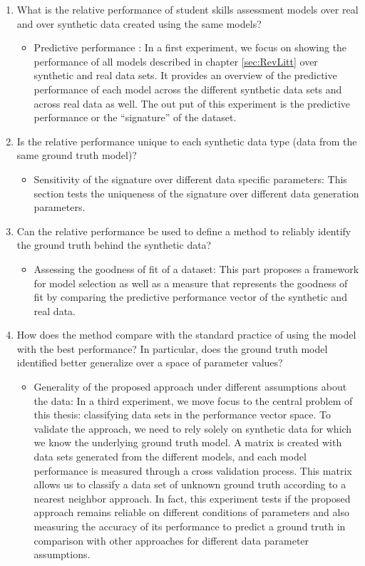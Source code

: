 \begin{enumerate}
\item What is the relative performance of student skills assessment models over real and over synthetic data created using the same models?
\begin{itemize}
\item Predictive performance : In a first experiment, we focus on showing the performance of all models described in chapter \ref{sec:RevLitt} over synthetic and real data sets.  It provides an overview of the predictive performance of each model across the different synthetic data sets and across real data as well. The out put of this experiment is the predictive performance or the ``signature'' of the dataset.
\end{itemize}
\item Is the relative performance unique to each synthetic data type (data from the same ground truth model)?
\begin{itemize}
\item Sensitivity of the signature over different data specific parameters: This section tests the uniqueness of the signature over different data generation parameters.
\end{itemize}
\item Can the relative performance be used to define a method to reliably identify the ground truth behind the synthetic data?
\begin{itemize}
\item Assessing the goodness of fit of a dataset: This part proposes a framework for model selection as well as a measure that represents the goodness of fit by comparing the predictive performance vector of the synthetic and real data.
\end{itemize}
\item How does the method compare with the standard practice of using the model with the best performance?  In particular, does the ground truth model identified better generalize over a space of parameter values?
\begin{itemize}
\item Generality of the proposed approach under different assumptions about the data: In a third experiment, we move focus to the central problem of this thesis: classifying data sets in the performance vector space.  To validate the approach, we need to rely solely on synthetic data for which we know the underlying ground truth model.  A matrix is created with data sets generated from the different models, and each model performance is measured through a cross validation process.  This matrix allows us to classify a data set of unknown ground truth according to a nearest neighbor approach. In fact, this experiment tests if the proposed approach remains reliable on different conditions of parameters and also measuring the accuracy of its performance to predict a ground truth in comparison with other approaches for different data parameter assumptions.
\end{itemize}
\end{enumerate}


